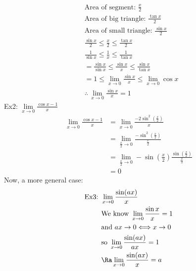\begin{align*}
    &\text{Area of segment: }\frac{x}{2}\\
    &\text{Area of big triangle: }\frac{\tan x}{2}\\
    &\text{Area of small triangle: } \frac{\sin x}{2}\\
    &\frac{\sin x}{2}\leq\frac{x}{2}\leq\frac{\tan x}{2}\\
    &\frac{1}{\sin x}\leq\frac{1}{x}\leq\frac{1}{\tan x}\\
    &=\frac{\sin x}{\sin x}\leq\frac{\sin x}{x}\leq \frac{\sin x}{\tan x}\\
    &=1\leq\lim_{x\to 0}\frac{\sin x}{x}\leq\lim_{x\to 0}\cos x\\
    &\therefore\,\lim_{x\to 0}\frac{\sin x}{x}=1
\end{align*}
Ex2: $\lim\limits_{x\to 0}\frac{\cos x-1}{x}$
\begin{align*}
    \lim\limits_{x\to 0}\frac{\cos x-1}{x}&=\lim_{x\to 0}\frac{-2\sin^2\left(\frac{x}{2}\right)}{x}\\
    &=\lim_{\frac{x}{2}\to 0}\frac{-\sin^2\left(\frac{x}{2}\right)}{\frac{x}{2}}\\
    &=\lim_{\frac{x}{2}\to 0}-\sin\left(\frac{x}{2}\right)\frac{\sin\left(\frac{x}{2}\right)}{\frac{x}{2}}\\
    &=0
\end{align*}
Now, a more general case:
\begin{align*}
    \text{Ex3: }&\lim_{x\to 0}\frac{\sin(ax)}{x}\\
    &\text{We know }\lim_{x\to 0}\frac{\sin x}{x}=1\\
    &\text{and }ax\to 0\Longleftrightarrow x\to 0\\
    &\text{so }\lim_{x\to 0}\frac{\sin(ax)}{ax}=1\\
    &\Ra\lim_{x\to 0}\frac{\sin(ax)}{x}=a
\end{align*}

